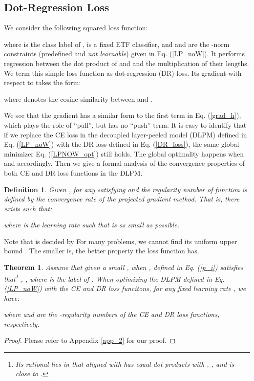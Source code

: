 \documentclass{article}
\newtheorem{theorem}{Theorem}
\newtheorem{proof}{Proof}
\newtheorem{definition}{Definition}
\newcommand{\<}{\left\langle}
\renewcommand{\>}{\right\rangle}
\begin{document}
\vspace{-1mm}
\subsection{Dot-Regression Loss}
We consider the following squared loss function:

where  is the class label of ,  is a fixed ETF classifier, and  and  are the -norm constraints (predefined and \emph{not learnable}) given in Eq. (\ref{LP_noW}). It performs regression between the dot product of  and  and the multiplication of their lengths. We term this simple loss function as dot-regression (DR) loss. Its gradient with respect to  takes the form:

where  denotes the cosine similarity between  and . 





We see that the gradient has a similar form to the first term in Eq. (\ref{grad_h}), which plays the role of ``pull'', but has no ``push'' term. It is easy to identify that if we replace the CE loss in the decoupled layer-peeled model (DLPM) defined in Eq. (\ref{LP_noW}) with the DR loss defined in Eq. (\ref{DR_loss}), the same global minimizer Eq. (\ref{LPNOW_opt}) still holds. The global optimality happens when  and  accordingly. Then we give a formal analysis of the convergence properties of both CE and DR loss functions in the DLPM. 




\begin{definition}\label{def2}
	Given ,  for any  satisfying   and  the regularity number of function  is defined by the convergence rate of the projected gradient method. That is, there exists    such that:
	
	where  is the learning rate such that  is as small as possible.
\end{definition}
Note that  is decided by  For many problems, we cannot find its uniform upper bound . The smaller  is, the better property the loss function has. 






\begin{theorem}
	\label{reg_dot_loss}
	Assume that given a small , when ,  defined in Eq. (\ref{p_i}) satisfies that\footnote{Its rational lies in that  aligned with  has equal dot products with , , and  is close to .}  , , where  is the label of . When optimizing the DLPM defined in Eq. (\ref{LP_noW}) with the CE and DR loss funcitons, for any fixed learning rate , we have:
	
	where  and  are the -regularity numbers of the CE and DR loss functions, respectively. 
\end{theorem}
\begin{proof} 
	Please refer to Appendix \ref{app_2} for our proof. 	  
\end{proof}
\end{document}
